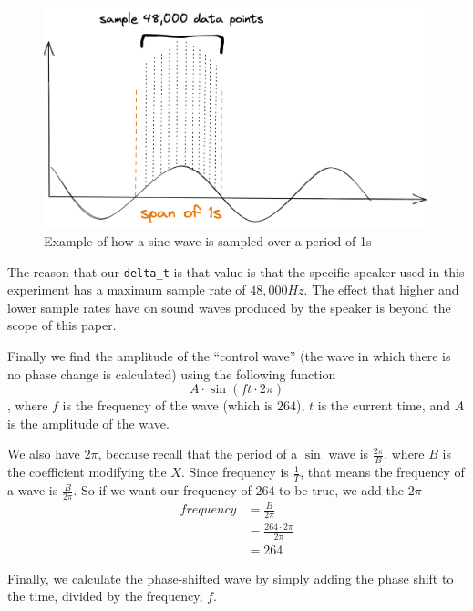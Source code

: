 \documentclass[index]{subfiles}
\begin{document}
\begin{figure}[H]
    \centering
    \includegraphics[scale=0.15]{res/sampling.png}
    \caption{Example of how a sine wave is sampled over a period of 1s}
\end{figure}

The reason that our \verb+delta_t+ is that value is that the specific speaker used in this experiment has a maximum sample rate of \(48,000Hz\). The effect that higher and lower sample rates have on sound waves produced by the speaker is beyond the scope of this paper.

Finally we find the amplitude of the ``control wave'' (the wave in which there is no phase change is calculated) using the following function
\begin{equation*}
    A\cdot\sin\left(ft\cdot2\pi\right)
\end{equation*}, where \(f\) is the frequency of the wave (which is \(264\)), \(t\) is the current time, and \(A\) is the amplitude of the wave.

We also have \(2\pi\), because recall that the period of a \(\sin\) wave is \(\frac{2\pi}{B}\), where \(B\) is the coefficient modifying the \(X\). Since frequency is \(\frac{1}{T}\), that means the frequency of a wave is \(\frac{B}{2\pi}\). So if we want our frequency of \(264\) to be true, we add the \(2\pi\)
\begin{align*}
    frequency & =\frac{B}{2\pi}            \\
              & =\frac{264\cdot2\pi}{2\pi} \\
              & =264
\end{align*}

Finally, we calculate the phase-shifted wave by simply adding the phase shift to the time, divided by the frequency, \(f\).
\end{document}
